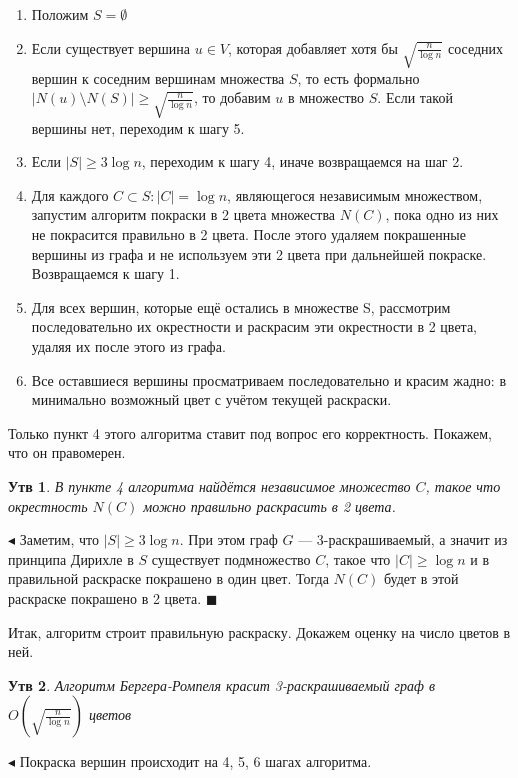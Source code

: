 \documentclass{article}
\newtheorem*{statement}{Утв}
\begin{document}
\begin{enumerate}
\item Положим $ S = \emptyset $
\item Если существует вершина $u \in V$, которая добавляет хотя бы $\sqrt{\frac{n}{\log{n}}}$ соседних вершин к соседним вершинам множества $S$, то есть формально $|N(u) \setminus N(S)| \ge \sqrt{\frac{n}{\log{n}}}$, то добавим $u$ в множество $S$. Если такой вершины нет, переходим к шагу 5.
\item Если $|S| \ge 3\log{n}$, переходим к шагу 4, иначе возвращаемся на шаг 2.
\item Для каждого $ C \subset S: |C| = \log{n} $, являющегося независимым множеством, запустим алгоритм покраски в 2 цвета множества $N(C)$, пока одно из них не покрасится правильно в 2 цвета. После этого удаляем покрашенные вершины из графа и не используем эти 2 цвета при дальнейшей покраске. Возвращаемся к шагу 1.
\item Для всех вершин, которые ещё остались в множестве S, рассмотрим последовательно их окрестности и раскрасим эти окрестности в 2 цвета, удаляя их после этого из графа.
\item Все оставшиеся вершины просматриваем последовательно и красим жадно: в минимально возможный цвет с учётом текущей раскраски.
\end{enumerate}

Только пункт 4 этого алгоритма ставит под вопрос его корректность. Покажем, что он правомерен.

\begin{statement}
В пункте 4 алгоритма найдётся независимое множество $C$, такое что окрестность $N(C)$ можно правильно раскрасить в 2 цвета.
\end{statement}
$\blacktriangleleft$
Заметим, что $|S| \ge 3\log{n}$. При этом граф $G$ --- 3-раскрашиваемый, а значит из принципа Дирихле в $S$ существует подмножество $C$, такое что $|C| \ge \log{n}$ и в правильной раскраске покрашено в один цвет. Тогда $N(C)$ будет в этой раскраске покрашено в 2 цвета.
$\blacksquare$

\bigskip

Итак, алгоритм строит правильную раскраску. Докажем оценку на число цветов в ней.

\begin{statement}
Алгоритм Бергера-Ромпеля красит 3-раскрашиваемый граф в $O(\sqrt{\frac{n}{\log{n}}})$ цветов
\end{statement}
$\blacktriangleleft$
Покраска вершин происходит на 4, 5, 6 шагах алгоритма. 
\end{document}
